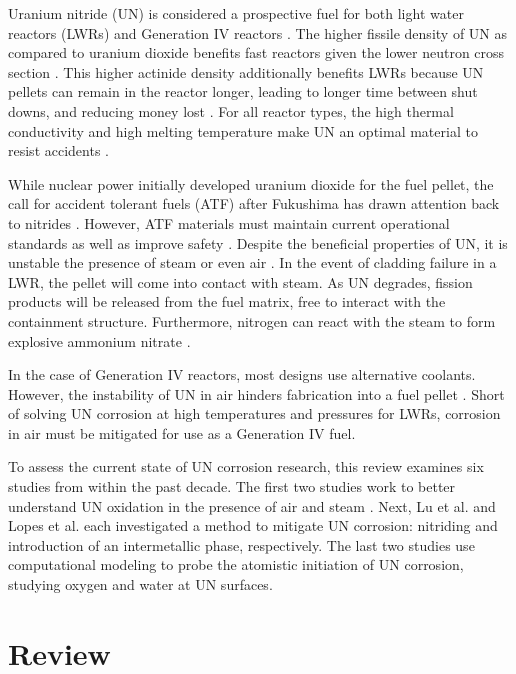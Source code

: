 \documentclass[3p,review,11pt]{elsarticle}
\begin{document}
Uranium nitride (UN) is considered a prospective fuel for both light water reactors (LWRs) and Generation IV reactors \cite{Streit2005,Mizutani1998}. The higher fissile density of UN as compared to uranium dioxide benefits fast reactors given the lower neutron cross section \cite{Silva2009}. This higher actinide density additionally benefits LWRs because UN pellets can remain in the reactor longer, leading to longer time between shut downs, and reducing money lost \cite{Lopes2017}. For all reactor types, the high thermal conductivity and high melting temperature make UN an optimal material to resist accidents \cite{Lopes2017}.
\par 
While nuclear power initially developed uranium dioxide for the fuel pellet, the call for accident tolerant fuels (ATF) after Fukushima has drawn attention back to nitrides \cite{Johnson2016}. However, ATF materials must maintain current operational standards as well as improve safety \cite{Zinkle2014}. Despite the beneficial properties of UN, it is unstable the presence of steam or even air \cite{Johnson2016,Jolkkonen2017,Lopes2017}. In the event of cladding failure in a LWR, the pellet will come into contact with steam. As UN degrades, fission products will be released from the fuel matrix, free to interact with the containment structure. Furthermore, nitrogen can react with the steam to form explosive ammonium nitrate \cite{Jolkkonen2017}.
\par 
 In the case of Generation IV reactors, most designs use alternative coolants. However, the instability of UN in air hinders fabrication into a fuel pellet \cite{Lopes2017}. Short of solving UN corrosion at high temperatures and pressures for LWRs, corrosion in air must be mitigated for use as a Generation IV fuel.
 \par 
 To assess the current state of UN corrosion research, this review examines six studies from within the past decade. The first two studies work to better understand UN oxidation in the presence of air \cite{Johnson2016} and steam \cite{Jolkkonen2017}. Next, Lu et al. \cite{Lu2016} and Lopes et al. \cite{Lopes2017} each investigated a method to mitigate UN corrosion: nitriding and introduction of an intermetallic phase, respectively. The last two studies use computational modeling to probe the atomistic initiation of UN corrosion, studying oxygen \cite{Bocharov2013} and water \cite{Bo2016} at UN surfaces.

\section{Review}
\end{document}
